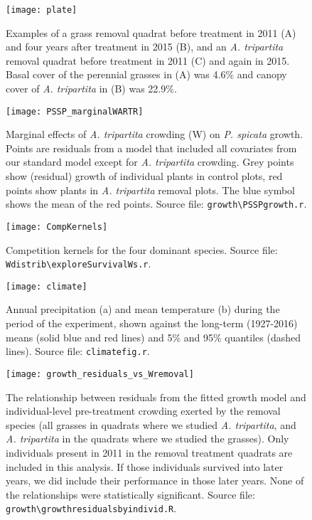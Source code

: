 \documentclass[11pt]{article}
\begin{document}
 \begin{figure}[h]
 \centering
 \texttt{[image: plate]}
 \caption{Examples of a grass removal quadrat before treatment in 2011 (A) and four years after treatment in 2015 (B), and an \textit{A. tripartita} removal quadrat before treatment in 2011 (C) and again in 2015. Basal cover of the perennial grasses in (A) was 4.6\% and canopy cover of  \textit{A. tripartita} in (B) was 22.9\%. }
 \label{fig:photos}
 \end{figure}


 \begin{figure}[h]
 \centering
 \texttt{[image: PSSP\_marginalWARTR]}
 \caption{Marginal effects of \textit{A. tripartita} crowding (W) on \textit{P. spicata} growth. Points are residuals from a model that included all 
 covariates from our standard model except for \textit{A. tripartita} crowding. Grey points show (residual) growth of individual plants in control plots, red points show plants in \textit{A. tripartita} removal plots. The blue symbol shows the mean of the red points. Source file: \texttt{growth\textbackslash PSSPgrowth.r}. }
 \label{fig:PSSPresids}
 \end{figure}

 \begin{figure}[h]
 \centering
 \texttt{[image: CompKernels]}
 \caption{Competition kernels for the four dominant species. Source file: \texttt{Wdistrib\textbackslash exploreSurvivalWs.r}. }
 \label{fig:CompKernels}
 \end{figure}
 
  \begin{figure}[h]
  \centering
  \texttt{[image: climate]}
  \caption{Annual precipitation (a) and mean temperature (b) during the period of the experiment, shown against the long-term (1927-2016) means (solid blue and red lines) and 5\% and 95\% quantiles (dashed lines). Source file:  \texttt{climate\textunderscore fig.r}.}
  \label{fig:climate}
  \end{figure}
      
\begin{figure}[h]
\centering
\texttt{[image: growth\_residuals\_vs\_Wremoval]}
\caption{The relationship between residuals from the fitted growth model and individual-level pre-treatment crowding exerted by the removal species (all grasses in quadrats where we studied \textit{A. tripartita}, and \textit{A. tripartita} in the quadrats where we studied the grasses). Only individuals present in 2011 in the removal treatment quadrats are included in this analysis. If those individuals survived into later years, we did include their performance in those later years. None of the relationships were statistically significant. Source file:  \texttt{growth\textbackslash growth\textunderscore residuals\textunderscore by\textunderscore individ.R}.}
\label{fig:GrowthResidsIndivid}
\end{figure}
 
\end{document}
